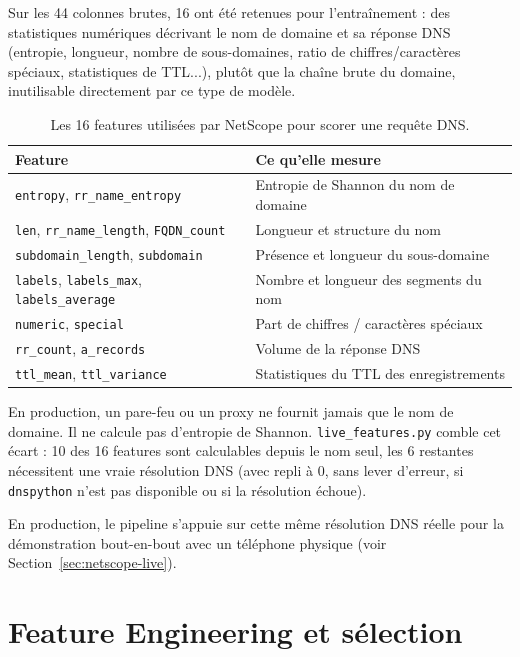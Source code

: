 \documentclass[12pt,a4paper]{report}
\begin{document}
Sur les 44 colonnes brutes, 16 ont été retenues pour l'entraînement : des statistiques numériques décrivant le nom de domaine et sa réponse DNS (entropie, longueur, nombre de sous-domaines, ratio de chiffres/caractères spéciaux, statistiques de TTL...), plutôt que la chaîne brute du domaine, inutilisable directement par ce type de modèle.

\begin{table}[h]
\centering
\small
\begin{tabular}{@{}p{3.2cm}p{9.8cm}@{}}
\toprule
\textbf{Feature} & \textbf{Ce qu'elle mesure} \\
\midrule
\texttt{entropy}, \texttt{rr\_name\_entropy} & Entropie de Shannon du nom de domaine \\
\texttt{len}, \texttt{rr\_name\_length}, \texttt{FQDN\_count} & Longueur et structure du nom \\
\texttt{subdomain\_length}, \texttt{subdomain} & Présence et longueur du sous-domaine \\
\texttt{labels}, \texttt{labels\_max}, \texttt{labels\_average} & Nombre et longueur des segments du nom \\
\texttt{numeric}, \texttt{special} & Part de chiffres / caractères spéciaux \\
\texttt{rr\_count}, \texttt{a\_records} & Volume de la réponse DNS \\
\texttt{ttl\_mean}, \texttt{ttl\_variance} & Statistiques du TTL des enregistrements \\
\bottomrule
\end{tabular}
\caption{Les 16 features utilisées par NetScope pour scorer une requête DNS.}
\end{table}

En production, un pare-feu ou un proxy ne fournit jamais que le nom de domaine. Il ne calcule pas d'entropie de Shannon. \texttt{live\_features.py} comble cet écart : 10 des 16 features sont calculables depuis le nom seul, les 6 restantes nécessitent une vraie résolution DNS (avec repli à 0, sans lever d'erreur, si \texttt{dnspython} n'est pas disponible ou si la résolution échoue).

En production, le pipeline s'appuie sur cette même résolution DNS réelle pour la démonstration bout-en-bout avec un téléphone physique (voir Section~\ref{sec:netscope-live}).

\section{Feature Engineering et sélection}
\end{document}
